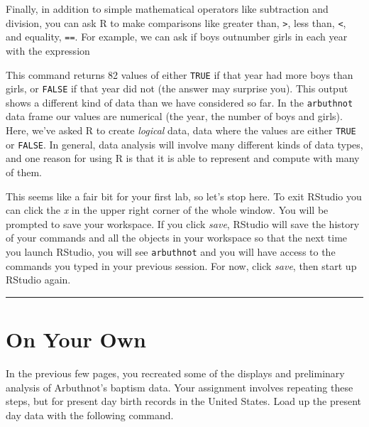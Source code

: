 \documentclass[]{book}
\newenvironment{Shaded}{\begin{snugshade}}{\end{snugshade}}
\newcommand{\NormalTok}[1]{#1}
\newcommand{\OperatorTok}[1]{\textcolor[rgb]{0.81,0.36,0.00}{\textbf{#1}}}
\newcommand{\StringTok}[1]{\textcolor[rgb]{0.31,0.60,0.02}{#1}}
\theoremstyle{definition}
\theoremstyle{definition}
\theoremstyle{definition}
\theoremstyle{remark}
\begin{document}
Finally, in addition to simple mathematical operators like subtraction
and division, you can ask R to make comparisons like greater than,
\texttt{\textgreater{}}, less than, \texttt{\textless{}}, and equality,
\texttt{==}. For example, we can ask if boys outnumber girls in each
year with the expression

\begin{Shaded}
\end{Shaded}

This command returns 82 values of either \texttt{TRUE} if that year had
more boys than girls, or \texttt{FALSE} if that year did not (the answer
may surprise you). This output shows a different kind of data than we
have considered so far. In the \texttt{arbuthnot} data frame our values
are numerical (the year, the number of boys and girls). Here, we've
asked R to create \emph{logical} data, data where the values are either
\texttt{TRUE} or \texttt{FALSE}. In general, data analysis will involve
many different kinds of data types, and one reason for using R is that
it is able to represent and compute with many of them.

This seems like a fair bit for your first lab, so let's stop here. To
exit RStudio you can click the \emph{x} in the upper right corner of the
whole window. You will be prompted to save your workspace. If you click
\emph{save}, RStudio will save the history of your commands and all the
objects in your workspace so that the next time you launch RStudio, you
will see \texttt{arbuthnot} and you will have access to the commands you
typed in your previous session. For now, click \emph{save}, then start
up RStudio again.

\begin{center}\rule{0.5\linewidth}{\linethickness}\end{center}

\hypertarget{on-your-own}{%
\section{On Your Own}\label{on-your-own}}

In the previous few pages, you recreated some of the displays and
preliminary analysis of Arbuthnot's baptism data. Your assignment
involves repeating these steps, but for present day birth records in the
United States. Load up the present day data with the following command.
\end{document}
